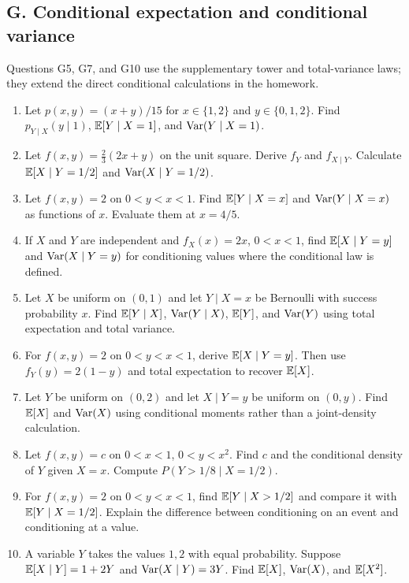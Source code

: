\subsection{G. Conditional expectation and conditional variance}
Questions G5, G7, and G10 use the supplementary tower and total-variance laws; they extend the direct conditional calculations in the homework.
\begin{enumerate}[label=\textbf{G\arabic*.},leftmargin=*,itemsep=0.75em]
\item Let $p(x,y)=(x+y)/15$ for $x\in\{1,2\}$ and $y\in\{0,1,2\}$. Find $p_{Y\mid X}(y\mid1)$, $\mathbb E[Y\mid X=1]$, and $\operatorname{Var}(Y\mid X=1)$.
\item Let $f(x,y)=\tfrac23(2x+y)$ on the unit square. Derive $f_Y$ and $f_{X\mid Y}$. Calculate $\mathbb E[X\mid Y=1/2]$ and $\operatorname{Var}(X\mid Y=1/2)$.
\item Let $f(x,y)=2$ on $0<y<x<1$. Find $\mathbb E[Y\mid X=x]$ and $\operatorname{Var}(Y\mid X=x)$ as functions of $x$. Evaluate them at $x=4/5$.
\item If $X$ and $Y$ are independent and $f_X(x)=2x$, $0<x<1$, find $\mathbb E[X\mid Y=y]$ and $\operatorname{Var}(X\mid Y=y)$ for conditioning values where the conditional law is defined.
\item Let $X$ be uniform on $(0,1)$ and let $Y\mid X=x$ be Bernoulli with success probability $x$. Find $\mathbb E[Y\mid X]$, $\operatorname{Var}(Y\mid X)$, $\mathbb E[Y]$, and $\operatorname{Var}(Y)$ using total expectation and total variance.
\item For $f(x,y)=2$ on $0<y<x<1$, derive $\mathbb E[X\mid Y=y]$. Then use $f_Y(y)=2(1-y)$ and total expectation to recover $\mathbb E[X]$.
\item Let $Y$ be uniform on $(0,2)$ and let $X\mid Y=y$ be uniform on $(0,y)$. Find $\mathbb E[X]$ and $\operatorname{Var}(X)$ using conditional moments rather than a joint-density calculation.
\item Let $f(x,y)=c$ on $0<x<1$, $0<y<x^2$. Find $c$ and the conditional density of $Y$ given $X=x$. Compute $P(Y>1/8\mid X=1/2)$.
\item For $f(x,y)=2$ on $0<y<x<1$, find $\mathbb E[Y\mid X>1/2]$ and compare it with $\mathbb E[Y\mid X=1/2]$. Explain the difference between conditioning on an event and conditioning at a value.
\item A variable $Y$ takes the values $1,2$ with equal probability. Suppose $\mathbb E[X\mid Y]=1+2Y$ and $\operatorname{Var}(X\mid Y)=3Y$. Find $\mathbb E[X]$, $\operatorname{Var}(X)$, and $\mathbb E[X^2]$.
\end{enumerate}
